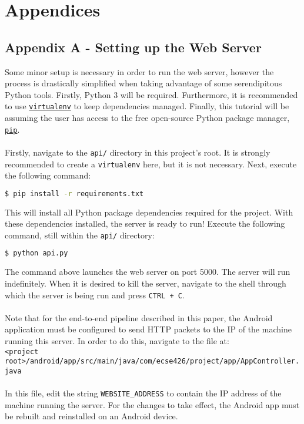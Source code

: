 \section*{Appendices}
\subsection*{Appendix A - Setting up the Web Server}
Some minor setup is necessary in order to run the web server, however the process is drastically
simplified when taking advantage of some serendipitous Python tools. Firstly, Python 3 will be
required. Furthermore, it is recommended to use
\href{https://pypi.org/project/virtualenv/}{\texttt{virtualenv}} to keep dependencies managed.
Finally, this tutorial will be assuming the user has access to the free open-source Python package
manager, \href{https://pypi.org/project/pip}{\texttt{pip}}.\\\\
Firstly, navigate to the \texttt{api/} directory in this project's root. It is strongly recommended
to create a \texttt{virtualenv} here, but it is not necessary. Next, execute the following command:
\begin{lstlisting}[language=bash,basicstyle=\ttfamily]
$ pip install -r requirements.txt
\end{lstlisting}
This will install all Python package dependencies required for the project. With these dependencies
installed, the server is ready to run! Execute the following command, still within the \texttt{api/}
directory:
\begin{lstlisting}[language=bash,basicstyle=\ttfamily]
$ python api.py
\end{lstlisting}
The command above launches the web server on port 5000. The server will run indefinitely. When it is
desired to kill the server, navigate to the shell through which the server is being run and press
\texttt{CTRL + C}.\\\\
Note that for the end-to-end pipeline
described in this paper, the Android application must be configured to send HTTP packets to the IP
of the machine running this server. In order to do this, navigate to the file at:\\
\texttt{<project root>/android/app/src/main/java/com/ecse426/project/app/AppController.java}\\\\
In this file, edit the string \texttt{WEBSITE\_ADDRESS} to contain the IP address of the machine
running the server. For the changes to take effect, the Android app must be rebuilt and reinstalled
on an Android device.
